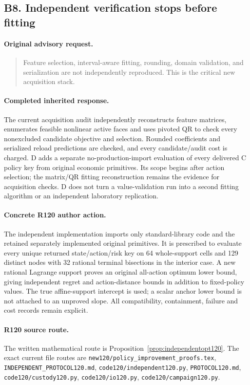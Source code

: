 \subsection{B8. Independent verification stops before fitting}
\label{response120:B8}
\paragraph{Original advisory request.}
\begin{quote}
Feature selection, interval-aware fitting, rounding, domain validation, and serialization are not independently reproduced. This is the critical new acquisition stack.
\end{quote}
\paragraph{Completed inherited response.}
The current acquisition audit independently reconstructs feature matrices, enumerates feasible nonlinear active faces and uses pivoted QR to check every nonexcluded candidate objective and selection. Rounded coefficients and serialized reload predictions are checked, and every candidate/audit cost is charged. D adds a separate no-production-import evaluation of every delivered C policy key from original economic primitives. Its scope begins after action selection; the matrix/QR fitting reconstruction remains the evidence for acquisition checks. D does not turn a value-validation run into a second fitting algorithm or an independent laboratory replication.
\paragraph{Concrete R120 author action.}
The independent implementation imports only standard-library code and the retained separately implemented original primitives. It is prescribed to evaluate every unique returned state/action/risk key on 64 whole-support cells and 129 distinct nodes with 32 rational terminal bisections in the interior case. A new rational Lagrange support proves an original all-action optimum lower bound, giving independent regret and action-distance bounds in addition to fixed-policy values. The true affine-support intercept is used; a scalar anchor lower bound is not attached to an unproved slope. All compatibility, containment, failure and cost records remain explicit.
\paragraph{R120 source route.}
The written mathematical route is Proposition~\ref{prop:independentopt120}. The exact current file routes are \nolinkurl{new120/policy_improvement_proofs.tex}, \nolinkurl{INDEPENDENT_PROTOCOL120.md}, \nolinkurl{code120/independent120.py}, \nolinkurl{PROTOCOL120.md}, \nolinkurl{code120/custody120.py}, \nolinkurl{code120/io120.py}, \nolinkurl{code120/campaign120.py}.
